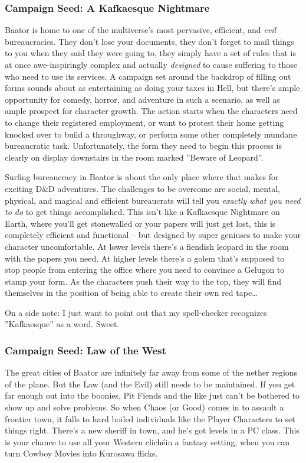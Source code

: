 \subsubsection{Campaign Seed: A Kafkaesque Nightmare}

Baator is home to one of the multiverse's most pervasive, efficient, and \textit{evil} bureaucracies. They don't lose your documents, they don't forget to mail things to you when they said they were going to, they simply have a set of rules that is at once awe-inspiringly complex and actually \textit{designed} to cause suffering to those who need to use its services. A campaign set around the backdrop of filling out forms sounds about as entertaining as doing your taxes in Hell, but there's ample opportunity for comedy, horror, and adventure in such a scenario, as well as ample prospect for character growth. The action starts when the characters need to change their registered employment, or want to protest their home getting knocked over to build a throughway, or perform some other completely mundane bureaucratic task. Unfortunately, the form they need to begin this process is clearly on display downstairs in the room marked ''Beware of Leopard''.

Surfing bureaucracy in Baator is about the only place where that makes for exciting D\&D adventures. The challenges to be overcome are social, mental, physical, and magical and efficient bureaucrats will tell you \textit{exactly what you need to do} to get things accomplished. This isn't like a Kafkaesque Nightmare on Earth, where you'll get stonewalled or your papers will just get lost, this is completely efficient and functional -- but designed by super geniuses to make your character uncomfortable. At lower levels there's a fiendish leopard in the room with the papers you need. At higher levels there's a golem that's supposed to stop people from entering the office where you need to convince a Gelugon to stamp your form. As the characters push their way to the top, they will find themselves in the position of being able to create their own red tape\ldots

On a side note: I just want to point out that my spell-checker recognizes ''Kafkaesque'' as a word. Sweet.

\subsubsection{Campaign Seed: Law of the West}

The great cities of Baator are infinitely far away from some of the nether regions of the plane. But the Law (and the Evil) still needs to be maintained. If you get far enough out into the boonies, Pit Fiends and the like just can't be bothered to show up and solve problems. So when Chaos (or Good) comes in to assault a frontier town, it falls to hard boiled individuals like the Player Characters to set things right. There's a new sheriff in town, and he's got levels in a PC class. This is your chance to use all your Western clichéin a fantasy setting, when you can turn Cowboy Movies into Kurosawa flicks.

